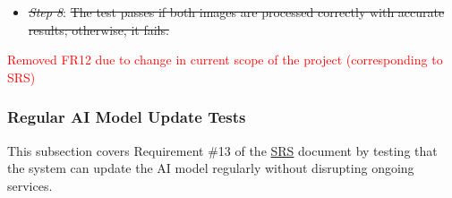 \documentclass[12pt, titlepage]{article}
\begin{document}
\begin{enumerate}
\begin{itemize}
    \begin{itemize}
      \item \sout{The MRI image is correctly recognized.}
      \item \sout{The MRI-specific analysis module is used.}
      \item \sout{Results are accurate and modality-specific.}
    \end{itemize}
  \item[-] \textit{\sout{Step 8}}: \sout{The test passes if both images are processed correctly with accurate results; otherwise, it fails.}
\end{itemize}

\textcolor{red}{Removed FR12 due to change in current scope of the project (corresponding to SRS)}

\subsubsection{Regular AI Model Update Tests}

This subsection covers Requirement \#13 of the \href{https://github.com/RezaJodeiri/CXR-Capstone/blob/main/docs/SRS/SRS.pdf}{SRS} \citep{SRS}
document by testing that the system can update the AI model regularly without disrupting ongoing services.
\end{enumerate}
\end{document}
